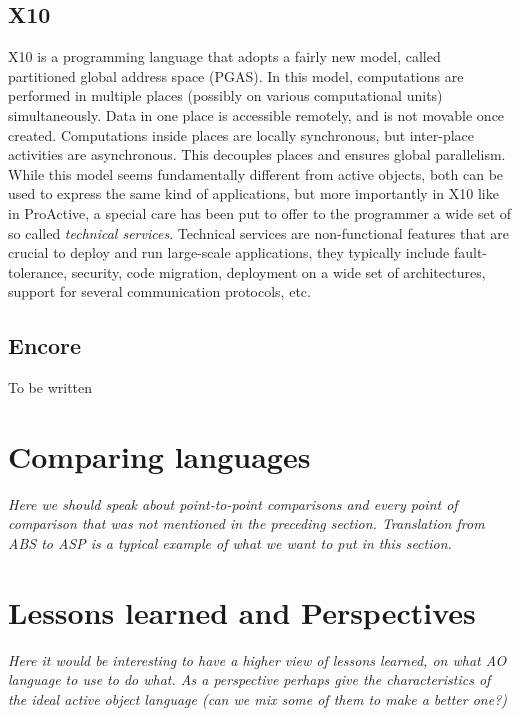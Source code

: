 \subsection{X10} 
X10 \cite{charles2005x10} is a programming language that adopts a
fairly new model, called partitioned global address space (PGAS). In this model,
computations are performed in multiple places (possibly on various computational units)
simultaneously. Data in one place is accessible remotely, and is not movable once
created. Computations inside places are locally synchronous, but inter-place activities
are asynchronous. This decouples places and ensures global parallelism. While this model
seems fundamentally different from active objects, both can be used to express the same
kind of applications, but more importantly in X10 like in ProActive, a special care has
been put to offer to the programmer a wide set of so called \emph{technical services}.
Technical services are non-functional features that are crucial to deploy and run
large-scale applications, they typically include fault-tolerance, security, code
migration, deployment on a wide set of architectures, support for several communication
protocols, etc. 

\subsection{Encore}
To be written

\section{Comparing languages} 

\emph{Here we should speak about point-to-point comparisons and every point of
	comparison that was not mentioned in the preceding section. Translation from ABS to 
	ASP is a typical example of what we want to put in this section.}



\section{Lessons learned and Perspectives}
\emph{Here it would be interesting to have a higher view of lessons learned, on what AO 
language to use to do what. As a perspective perhaps give the characteristics of the 
ideal active object language (can we mix some of them to make a better one?)}